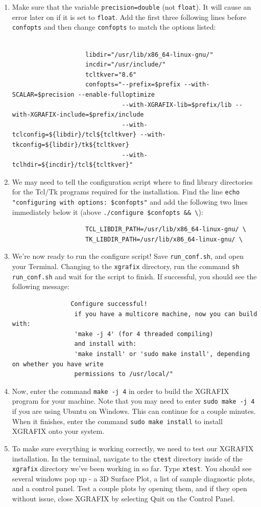 \documentclass{article}
\begin{document}
\begin{enumerate}
		\item Make sure that the variable \verb|precision=double| (not \verb|float|). It will cause an error later on if it is set to \verb|float|. Add the first three following lines before \verb|confopts| and then change \verb|confopts| to match the options listed:
		\begin{verbatim}
			        
			        libdir="/usr/lib/x86_64-linux-gnu/"
			        incdir="/usr/include/"
			        tcltkver="8.6"
			        confopts="--prefix=$prefix --with-SCALAR=$precision --enable-fulloptimize
			                  --with-XGRAFIX-lib=$prefix/lib --with-XGRAFIX-include=$prefix/include
			                  --with-tclconfig=${libdir}/tcl${tcltkver} --with-tkconfig=${libdir}/tk${tcltkver}
			                  --with-tclhdir=${incdir}/tcl${tcltkver}"
		\end{verbatim}
		
		
		\item We may need to tell the configuration script where to find library directories for the Tcl/Tk programs required for the installation. Find the line \verb|echo "configuring with options: $confopts"| and add the following two lines immediately below it (above \verb|./configure $confopts && \|):
		\begin{verbatim}
		            TCL_LIBDIR_PATH=/usr/lib/x86_64-linux-gnu/ \
		            TK_LIBDIR_PATH=/usr/lib/x86_64-linux-gnu/ \
		\end{verbatim}
		
		\item We're now ready to run the configure script! Save \verb|run_conf.sh|, and open your Terminal. Changing to the \verb|xgrafix| directory, run the command \verb|sh run_conf.sh| and wait for the script to finish. If successful, you should see the following message: 
		\begin{verbatim}
		        Configure successful!
		         if you have a multicore machine, now you can build with:
		         'make -j 4' (for 4 threaded compiling)
		         and install with:
		         'make install' or 'sudo make install', depending on whether you have write
		         permissions to /usr/local/"
		\end{verbatim}
		
		\item Now, enter the command \verb|make -j 4| in order to build the XGRAFIX program for your machine. Note that you may need to enter \verb|sudo make -j 4| if you are using Ubuntu on Windows. This can continue for a couple minutes. When it finishes, enter the command \verb|sudo make install| to install XGRAFIX onto your system. 
		
		\item To make sure everything is working correctly, we need to test our XGRAFIX installation. In the terminal, navigate to the \verb|ctest| directory inside of the \verb|xgrafix| directory we've been working in so far. Type \verb|xtest|. You should see several windows pop up - a 3D Surface Plot, a list of sample diagnostic plots, and a control panel. Test a couple plots by opening them, and if they open without issue, close XGRAFIX by selecting Quit on the Control Panel. 
	\end{enumerate}
\end{document}
